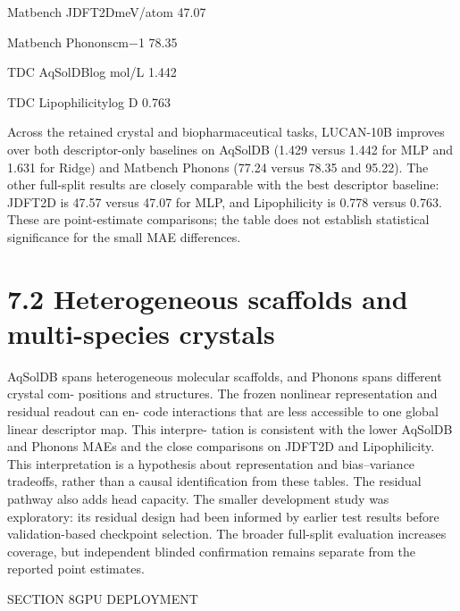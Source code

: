 \documentclass[11pt]{article}
\begin{document}
\noindent Matbench JDFT2D\quad meV/atom 47.07\par


\noindent Matbench Phonons\quad cm\ensuremath{-}1 78.35\par


\noindent TDC AqSolDB\quad log mol/L 1.442\par


\noindent TDC Lipophilicity\quad log D 0.763\par

Across the retained crystal and biopharmaceutical tasks, LUCAN-10B improves over both
descriptor-only baselines on AqSolDB (1.429 versus 1.442 for MLP and 1.631 for Ridge) and
Matbench Phonons (77.24 versus 78.35 and 95.22). The other full-split results are closely
comparable with the best descriptor baseline: JDFT2D is 47.57 versus 47.07 for MLP, and
Lipophilicity is 0.778 versus 0.763. These are point-estimate comparisons; the table does
not establish statistical significance for the small MAE differences.

\section*{7.2 Heterogeneous scaffolds and multi-species crystals}

AqSolDB spans heterogeneous molecular scaffolds, and Phonons spans different crystal com-
positions and structures. The frozen nonlinear representation and residual readout can en-
code interactions that are less accessible to one global linear descriptor map. This interpre-
tation is consistent with the lower AqSolDB and Phonons MAEs and the close comparisons
on JDFT2D and Lipophilicity.
This interpretation is a hypothesis about representation and bias–variance tradeoffs, rather
than a causal identification from these tables. The residual pathway also adds head capacity.
The smaller development study was exploratory: its residual design had been informed
by earlier test results before validation-based checkpoint selection. The broader full-split
evaluation increases coverage, but independent blinded confirmation remains separate from
the reported point estimates.


\noindent SECTION 8\quad GPU DEPLOYMENT\par
\end{document}
